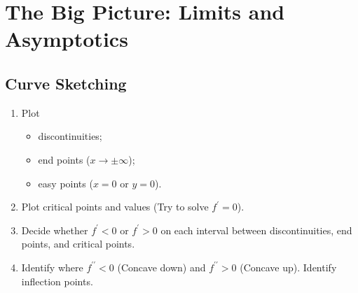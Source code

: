\section{The Big Picture: Limits and Asymptotics}
\subsection{Curve Sketching}
\begin{enumerate}
\item Plot
  \begin{itemize}
  \item discontinuities;
  \item end points ($x\to\pm\infty$);
  \item easy points ($x=0$ or $y=0$).
  \end{itemize}
\item Plot critical points and values (Try to solve $f^\prime=0$).
\item Decide whether $f^\prime<0$ or $f^\prime>0$ on each interval between discontinuities, end points, and critical points.
\item Identify where $f^{\prime\prime}<0$ (Concave down) and $f^{\prime\prime}>0$ (Concave up). Identify inflection points.
\end{enumerate}

